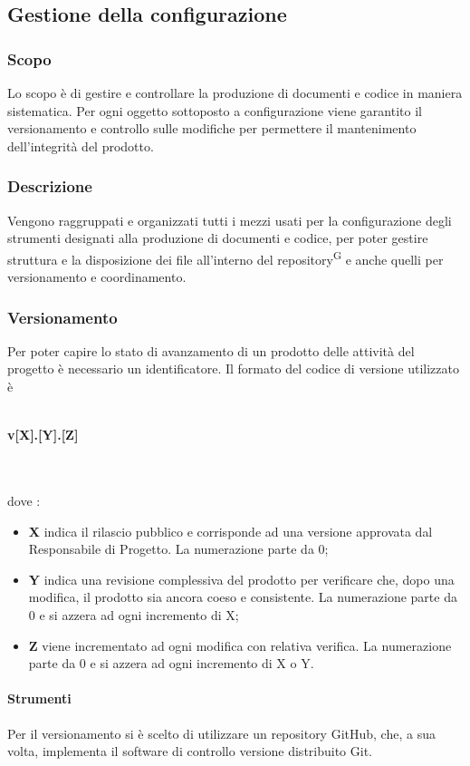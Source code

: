 \subsection{Gestione della configurazione}
\subsubsection{Scopo}
Lo scopo è di gestire e controllare la produzione di documenti e codice in maniera sistematica. Per ogni oggetto sottoposto a configurazione viene garantito il versionamento e controllo sulle modifiche per permettere il mantenimento dell'integrità del prodotto. 

\subsubsection{Descrizione}
Vengono raggruppati e organizzati tutti i mezzi usati per la configurazione degli strumenti designati alla produzione di documenti e codice, per poter gestire struttura e la disposizione dei file all’interno del repository\textsuperscript{G} e anche  quelli per versionamento e coordinamento.

\subsubsection{Versionamento}
Per poter capire lo stato di avanzamento di un prodotto delle attività del progetto è necessario un identificatore. Il formato del codice di versione utilizzato è \\ \\
\centerline{\textbf{v[X].[Y].[Z]}} \\ \\
dove :
\begin{itemize}
\item \textbf{X} indica il rilascio pubblico e corrisponde ad una versione approvata dal Responsabile di Progetto. La numerazione parte da 0;
\item \textbf{Y} indica una revisione complessiva del prodotto per verificare che, dopo una modifica, il prodotto sia ancora coeso e consistente. La numerazione parte da 0 e si azzera ad ogni incremento di X;
\item \textbf{Z} viene incrementato ad ogni modifica con relativa verifica. La numerazione parte da 0 e si azzera ad ogni incremento di X o Y.
\end{itemize}

\paragraph{Strumenti}
Per il versionamento si è scelto di utilizzare un repository GitHub, che, a sua volta, implementa il software di controllo versione distribuito Git.

